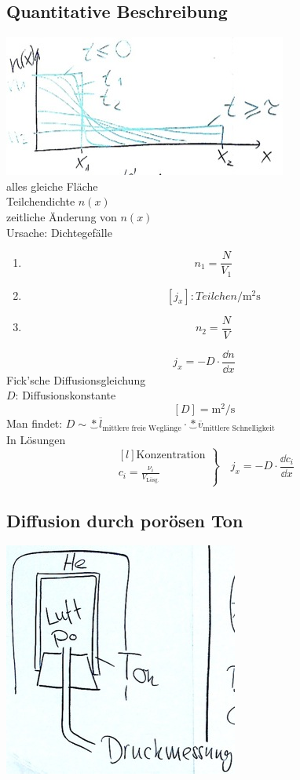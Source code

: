 \subsection{Quantitative Beschreibung}
\includegraphics{Bild123} \\
alles gleiche Fläche \\
Teilchendichte $n(x)$ \\
zeitliche Änderung von $n(x)$ \\
Ursache: Dichtegefälle
\begin{enumerate}
	\item \[ n_1 = \frac{N}{V_1} \]
	\item \[ [ j_x ] : \si{Teilchen \per\metre\squared\second} \]
	\item \[ n_2 = \frac{N}{V} \]
\end{enumerate}
\[ j_x = -D \cdot \frac{\dd n}{\dd x} \]
Fick'sche Diffusionsgleichung \\
$D$: Diffusionskonstante
\[ [ D ] = \si{\metre\squared\per\second} \]
Man findet: $D \sim \underbrace*{\overline{l}}_{\text{mittlere freie Weglänge}} \cdot \underbrace*{\overline{v}}_{\text{mittlere Schnelligkeit}}$ \\
In Lösungen
\[
	\left. \begin{matrix*}[l]
		\text{Konzentration} \\
		c_i = \frac{\nu_i}{V_{\text{Lösg.}}}
	\end{matrix*} \right\} \quad j_x = -D \cdot \frac{\dd c_i}{\dd x}
\]

\subsection{Diffusion durch porösen Ton}
\includegraphics{Bild124} \\

